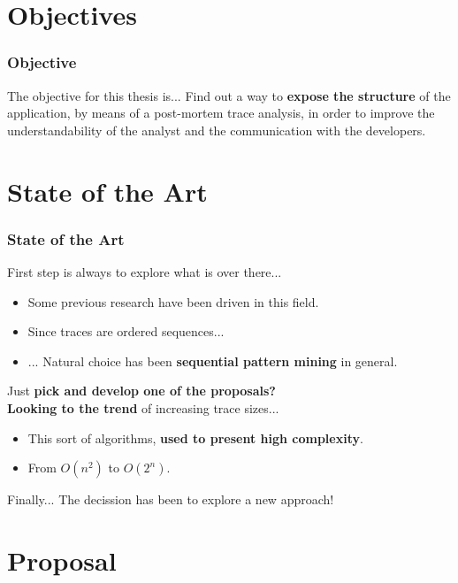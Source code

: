 \documentclass{beamer}
\begin{document}
\section{Objectives}
\begin{frame}
\frametitle{Objective}
	\begin{exampleblock}{The objective for this thesis is...}
		Find out a way to \textbf{expose the structure} of the application, by means of a post-mortem trace analysis, in order to improve the understandability of the analyst and the communication with the developers.
	\end{exampleblock}
\end{frame}

\section{State of the Art}

\begin{frame}
\frametitle{State of the Art}
	First step is always to explore what is over there...
	\begin{itemize}
		\item Some previous research have been driven in this field.
		\item Since traces are ordered sequences...
		\item ... Natural choice has been \textbf{sequential pattern mining} in general.
	\end{itemize}
	\vfill
	\pause
	Just \textbf{pick and develop one of the proposals?}\\
	\pause
	\vfill
	\textbf{Looking to the trend} of increasing trace sizes...\\
	\begin{itemize}
		\item This sort of algorithms, \textbf{used to present high complexity}.
		\item From $O(n^{2})$ to $O(2^{n})$.
	\end{itemize}
	\pause
	\begin{block}{Finally...}
		The decission has been to explore a new approach!
	\end{block}
\end{frame}

\section{Proposal}
\end{document}
